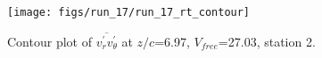 \begin{figure}[H]
\centering
\texttt{[image: figs/run\_17/run\_17\_rt\_contour]}
\caption{Contour plot of $\overline{v_{r}^{\prime} v_{\theta}^{\prime}}$ at $z/c$=6.97, $V_{free}$=27.03, station 2.}
\label{fig:run_17_rt_contour}
\end{figure}


